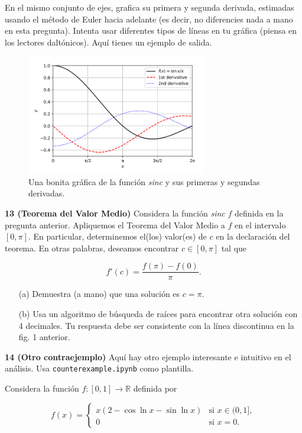 \documentclass{article}
\begin{document}
En el mismo conjunto de ejes, grafica su primera y segunda derivada, estimadas usando el método de Euler hacia adelante (es decir, no diferencies nada a mano en esta pregunta). Intenta usar diferentes tipos de líneas en tu gráfica (piensa en los lectores daltónicos). Aquí tienes un ejemplo de salida.

\begin{figure}[h]
    \centering
    \includegraphics[width=0.7\textwidth]{pictures/sinc.png}
    \caption{Una bonita gráfica de la función \textit{sinc} y sus primeras y segundas derivadas.}
    \label{fig:sinc_derivadas}
\end{figure}


\textbf{13 (Teorema del Valor Medio)} Considera la función \textit{sinc} \(f\) definida en la pregunta anterior. Apliquemos el Teorema del Valor Medio a \(f\) en el intervalo \([0, \pi]\). En particular, determinemos el(los) valor(es) de \(c\) en la declaración del teorema. En otras palabras, deseamos encontrar \(c \in [0, \pi]\) tal que

\[
f'(c) = \frac{f(\pi) - f(0)}{\pi}.
\]

\begin{itemize}
    \item[(a)] Demuestra (a mano) que una solución es \(c = \pi\).
    
    \item[(b)] Usa un algoritmo de búsqueda de raíces para encontrar otra solución con 4 decimales.  
    Tu respuesta debe ser consistente con la línea discontinua en la fig. 1 anterior.
\end{itemize}

\textbf{14 (Otro contraejemplo)} Aquí hay otro ejemplo interesante e intuitivo en el análisis. Usa \texttt{counterexample.ipynb} como plantilla.

Considera la función \(f : [0, 1] \to \mathbb{R}\) definida por

\[
f(x) = 
\begin{cases} 
x \left( 2 - \cos \ln x - \sin \ln x \right) & \text{si } x \in (0, 1], \\
0 & \text{si } x = 0.
\end{cases}
\]
\end{document}
